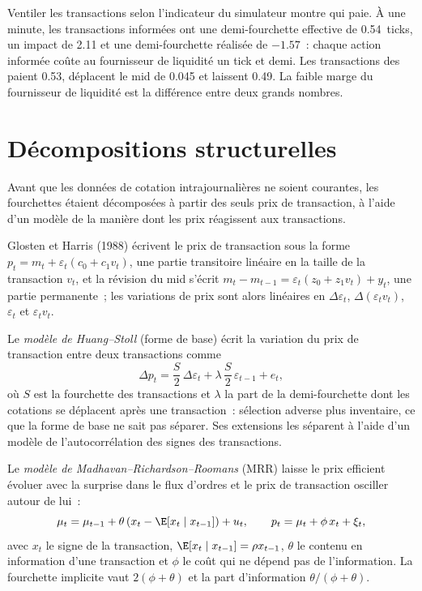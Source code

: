 Ventiler les transactions selon l'indicateur du simulateur montre qui paie. À une minute, les transactions informées ont une demi-fourchette effective de 0.54~ticks, un impact de
2.11 et une demi-fourchette réalisée de $-1.57$~: chaque action informée coûte au fournisseur de liquidité un tick et demi. Les transactions des  paient 0.53, déplacent le mid de 0.045 et laissent 0.49.
La faible marge du fournisseur de liquidité est la différence entre deux grands nombres.

\section{Décompositions structurelles}

Avant que les données de cotation intrajournalières ne soient courantes, les fourchettes étaient décomposées à partir des seuls prix de transaction, à l'aide d'un modèle de la manière dont les prix réagissent aux transactions.

Glosten et Harris (1988) écrivent le prix de transaction sous la forme $p_t=m_t+\varepsilon_t(c_0+c_1v_t)$, une partie transitoire linéaire en la taille de la transaction $v_t$, et
la révision du mid s'écrit $m_t-m_{t-1}=\varepsilon_t(z_0+z_1v_t)+y_t$, une partie permanente~; les variations de prix sont alors linéaires en $\Delta\varepsilon_t$,
$\Delta(\varepsilon_tv_t)$, $\varepsilon_t$ et $\varepsilon_tv_t$.

\begin{definition}\label{def:mx:decomposing-the-spread:hs}
Le \emph{modèle de Huang--Stoll} (forme de base) écrit la variation du prix de transaction entre deux transactions comme
\[
\Delta p_t=\frac S2\,\Delta\varepsilon_t+\lambda\,\frac S2\,\varepsilon_{t-1}+e_t,
\]
où $S$ est la fourchette des transactions et $\lambda$ la part de la demi-fourchette dont les cotations se déplacent après une transaction~: sélection adverse plus inventaire, ce que
la forme de base ne sait pas séparer. Ses extensions les séparent à l'aide d'un modèle de l'autocorrélation des signes des transactions.
\end{definition}

\begin{definition}\label{def:mx:decomposing-the-spread:mrr}
Le \emph{modèle de Madhavan--Richardson--Roomans} (MRR) laisse le prix efficient évoluer avec la surprise dans
le flux d'ordres et le prix de transaction osciller autour de lui~:
\[
\mu_t=\mu_{t-1}+\theta\left(x_t-\E[x_t\mid x_{t-1}]\right)+u_t,\qquad p_t=\mu_t+\phi\,x_t+\xi_t,
\]
avec $x_t$ le signe de la transaction, $\E[x_t\mid x_{t-1}]=\rho x_{t-1}$, $\theta$ le contenu en information d'une transaction et $\phi$ le coût qui ne dépend pas de
l'information. La fourchette implicite vaut $2(\phi+\theta)$ et la part d'information $\theta/(\phi+\theta)$.
\end{definition}

